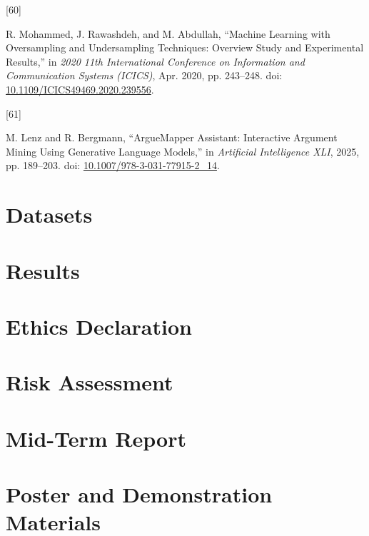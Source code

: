 \documentclass[twocolumn]{article}
\newlength{\cslhangindent}
\newlength{\csllabelwidth}
\newenvironment{CSLReferences}[2] %
 {\begin{list}{}{%
  \setlength{\itemindent}{0pt}
  \setlength{\leftmargin}{0pt}
  \setlength{\parsep}{0pt}
  \ifodd #1
   \setlength{\leftmargin}{\cslhangindent}
   \setlength{\itemindent}{-1\cslhangindent}
  \fi
  \setlength{\itemsep}{#2\baselineskip}}}
 {\end{list}}
\newcommand{\CSLLeftMargin}[1]{\parbox[t]{\csllabelwidth}{\strut#1\strut}}
\newcommand{\CSLRightInline}[1]{\parbox[t]{\linewidth - \csllabelwidth}{\strut#1\strut}}
\begin{document}
\begin{CSLReferences}{0}{0}
\CSLLeftMargin{{[}60{]} }%
\CSLRightInline{R. Mohammed, J. Rawashdeh, and M. Abdullah, {``Machine
{Learning} with {Oversampling} and {Undersampling Techniques}: {Overview
Study} and {Experimental Results},''} in \emph{2020 11th {International
Conference} on {Information} and {Communication Systems} ({ICICS})},
Apr. 2020, pp. 243--248. doi:
\href{https://doi.org/10.1109/ICICS49469.2020.239556}{10.1109/ICICS49469.2020.239556}.}

\CSLLeftMargin{{[}61{]} }%
\CSLRightInline{M. Lenz and R. Bergmann, {``{ArgueMapper Assistant}:
{Interactive Argument Mining Using Generative Language Models},''} in
\emph{Artificial {Intelligence XLI}}, 2025, pp. 189--203. doi:
\href{https://doi.org/10.1007/978-3-031-77915-2_14}{10.1007/978-3-031-77915-2\_14}.}

\end{CSLReferences}

\appendix

\section{Datasets}\label{app:datasets}

\section{Results}\label{app:results}

\section{Ethics Declaration}\label{ethics-declaration}

\section{Risk Assessment}\label{risk-assessment}

\section{Mid-Term Report}\label{mid-term-report}

\section{Poster and Demonstration
Materials}\label{poster-and-demonstration-materials}



\end{document}

